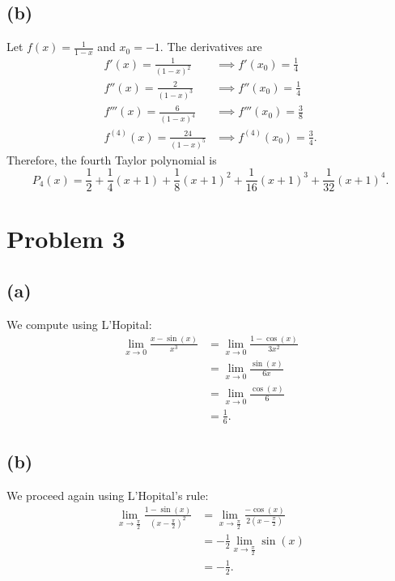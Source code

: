 \documentclass{article}
\begin{document}
\subsection*{(b)}
Let $f(x) = \frac{1}{1-x}$ and $x_0 = -1$. The derivatives are
\begin{align}
	f'(x) = \frac{1}{(1-x)^2} &\implies f'(x_0) = \frac{1}{4} \\
	f''(x) = \frac{2}{(1-x)^3} &\implies f''(x_0) = \frac{1}{4} \\
	f'''(x) = \frac{6}{(1-x)^4} &\implies f'''(x_0) = \frac{3}{8} \\
	f^{(4)}(x) = \frac{24}{(1-x)^5} &\implies f^{(4)}(x_0) = \frac{3}{4}.
\end{align}
Therefore, the fourth Taylor polynomial is
\begin{equation}
	P_4(x) = \frac{1}{2} + \frac{1}{4}(x + 1) + \frac{1}{8}(x + 1)^2 + \frac{1}{16}(x + 1)^3 + \frac{1}{32}(x + 1)^4.
\end{equation}
\section*{Problem 3}
\subsection*{(a)}
We compute using L'Hopital:
\begin{align}
	\lim\limits_{x \to 0} \frac{x - \sin(x)}{x^3} &= \lim\limits_{x \to 0}\frac{1 - \cos(x)}{3x^2} \\
	&= \lim\limits_{x \to 0} \frac{\sin(x)}{6x} \\
	&= \lim\limits_{x \to 0} \frac{\cos(x)}{6} \\
	&= \frac{1}{6}.
\end{align}

\subsection*{(b)}
We proceed again using L'Hopital's rule:
\begin{align}
	\lim\limits_{x \to \frac{\pi}{2}} \frac{1 - \sin(x)}{\left(x - \frac{\pi}{2}\right)^2} &= \lim\limits_{x \to \frac{\pi}{2}} \frac{-\cos(x)}{2 \left(x - \frac{\pi}{2}\right)} \\
	&= -\frac{1}{2}\lim\limits_{x \to \frac{\pi}{2}} \sin(x) \\
	&= -\frac{1}{2}.
\end{align}
\end{document}
